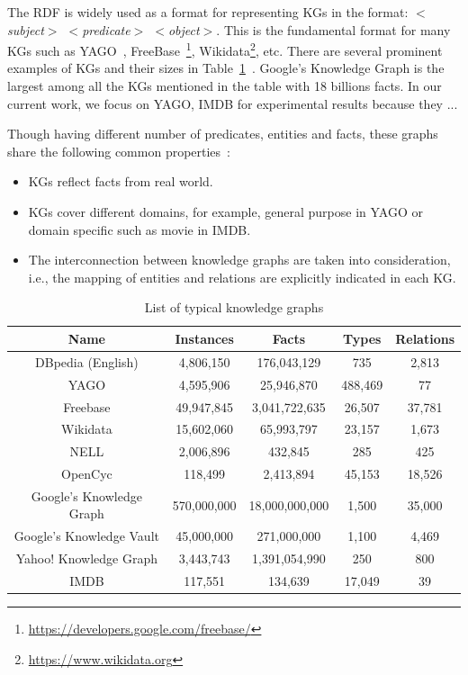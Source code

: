 The RDF is widely used as a format for representing KGs in the format: \textit{$<$subject$>$ $<$predicate$>$ $<$object$>$}. This is the fundamental format for many KGs such as YAGO~\cite{ref28}, FreeBase~\footnote{\url{https://developers.google.com/freebase/}}, Wikidata\footnote{\url{https://www.wikidata.org}}, etc. There are several prominent examples of KGs and their sizes in Table~\ref{table1}~\cite{ref27}. Google's Knowledge Graph is the largest among all the KGs mentioned in the table with 18 billions facts. In our current work, we focus on YAGO, IMDB for experimental results because they ...

Though having different number of predicates, entities and facts, these graphs share the following common properties~\cite{ref27}:

\begin{itemize}
\item KGs reflect facts from real world.
\item KGs cover different domains, for example, general purpose in YAGO or domain specific such as movie in IMDB.
\item The interconnection between knowledge graphs are taken into consideration, i.e., the mapping of entities and relations are explicitly indicated in each KG.
\end{itemize}

\begin{table}
\begin{center}
\begin{tabular}{|c|c|c|c|c|}
\hline
Name & Instances & Facts & Types & Relations\\
\hline\hline
DBpedia (English) & 4,806,150 & 176,043,129 & 735 & 2,813\\
\hline
YAGO & 4,595,906 & 25,946,870 & 488,469 & 77\\
\hline
Freebase & 49,947,845 & 3,041,722,635 & 26,507 & 37,781\\
\hline
Wikidata & 15,602,060 & 65,993,797 & 23,157 & 1,673\\
\hline
NELL & 2,006,896 & 432,845 & 285 & 425\\
\hline
OpenCyc & 118,499 & 2,413,894 & 45,153 & 18,526\\
\hline
Google's Knowledge Graph & 570,000,000 & 18,000,000,000 & 1,500 & 35,000\\
\hline
Google's Knowledge Vault & 45,000,000 & 271,000,000 & 1,100 & 4,469\\
\hline
Yahoo! Knowledge Graph & 3,443,743 & 1,391,054,990 & 250 & 800\\
\hline
IMDB & 117,551 & 134,639 & 17,049 & 39 \\
\hline
\end{tabular}
\end{center}
\caption{List of typical knowledge graphs}
\label{table1}
\end{table}

